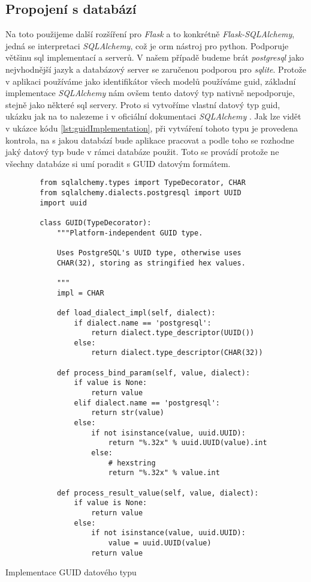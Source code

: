 \subsection{Propojení s databází}

Na toto použijeme další rozšíření pro \textit{Flask} a to konkrétně \textit{Flask-SQLAlchemy}, jedná se interpretaci \textit{SQLAlchemy}, což je \gls{orm} nástroj pro python.
Podporuje většinu \gls{sql} implementací a serverů. V našem případě budeme brát \textit{postgresql} jako nejvhodnější jazyk a databázový server se zaručenou podporou pro \textit{sqlite}. Protože
v aplikaci používáme jako identifikátor všech modelů používáme \gls{guid}, základní implementace \textit{SQLAlchemy} nám ovšem tento datový typ nativně nepodporuje, stejně jako
některé \gls{sql} servery. Proto si vytvoříme vlastní datový typ \gls{guid}, ukázku jak na to nalezeme i v oficiální dokumentaci \textit{SQLAlchemy} \cite{sqlalchemyGuid}. Jak lze
vidět v ukázce kódu \ref{lst:guidImplementation}, při vytváření tohoto typu je provedena kontrola, na s jakou databází bude aplikace pracovat a podle toho se rozhodne jaký datový typ
bude v rámci databáze použit. Toto se provádí protože ne všechny databáze si umí poradit s GUID datovým formátem.

\begin{listing}
    \begin{verbatim}
        from sqlalchemy.types import TypeDecorator, CHAR
        from sqlalchemy.dialects.postgresql import UUID
        import uuid

        class GUID(TypeDecorator):
            """Platform-independent GUID type.

            Uses PostgreSQL's UUID type, otherwise uses
            CHAR(32), storing as stringified hex values.

            """
            impl = CHAR

            def load_dialect_impl(self, dialect):
                if dialect.name == 'postgresql':
                    return dialect.type_descriptor(UUID())
                else:
                    return dialect.type_descriptor(CHAR(32))

            def process_bind_param(self, value, dialect):
                if value is None:
                    return value
                elif dialect.name == 'postgresql':
                    return str(value)
                else:
                    if not isinstance(value, uuid.UUID):
                        return "%.32x" % uuid.UUID(value).int
                    else:
                        # hexstring
                        return "%.32x" % value.int

            def process_result_value(self, value, dialect):
                if value is None:
                    return value
                else:
                    if not isinstance(value, uuid.UUID):
                        value = uuid.UUID(value)
                    return value
    \end{verbatim}
    \caption{Implementace GUID datového typu}
    \label{lst:guidImplementation}
\end{listing}

